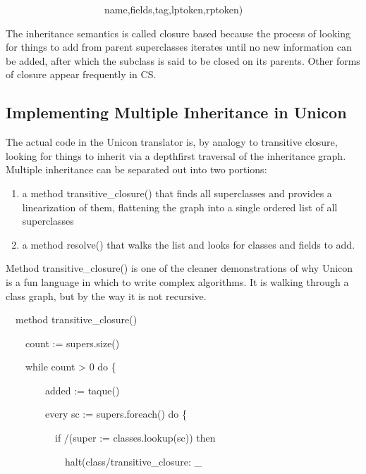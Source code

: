 {\ttfamily\mdseries
\ \ \ \ \ \ \ \ \ \ \ \ \ \ \ \ \ \ \ \ name,fields,tag,lptoken,rptoken)}

The inheritance semantics is called {\textquotedbl}closure
based{\textquotedbl} because the process of looking for things to add
from parent superclasses iterates until no new information can be
added, after which the subclass is said to be closed on its
parents. Other forms of closure appear frequently in CS.

\subsection{Implementing Multiple Inheritance in Unicon}

The actual code in the Unicon translator is, by analogy to transitive
closure, looking for things to inherit via a depthfirst traversal of
the inheritance graph. Multiple inheritance can be separated out into
two portions:

\liststyleLxliii
\begin{enumerate}

\item a method transitive\_closure() that finds all superclasses and
provides a linearization of them, flattening the graph into a single
ordered list of all superclasses

\item a method resolve() that walks the list and looks for classes and
fields to add.

\end{enumerate}

Method transitive\_closure() is one of the cleaner demonstrations of
why Unicon is a fun language in which to write complex algorithms. It
is walking through a class graph, but by the way it is not recursive.

{\ttfamily\mdseries
\ \ method transitive\_closure()}

{\ttfamily\mdseries
\ \ \ \ count := supers.size()}

{\ttfamily\mdseries
\ \ \ \ while count {\textgreater} 0 do \{}

{\ttfamily\mdseries
\ \ \ \ \ \ \ \ added := taque()}

{\ttfamily\mdseries
\ \ \ \ \ \ \ \ every sc := supers.foreach() do \{}

{\ttfamily\mdseries
\ \ \ \ \ \ \ \ \ \ if /(super := classes.lookup(sc)) then}

{\ttfamily\mdseries
\ \ \ \ \ \ \ \ \ \ \ \ halt({\textquotedbl}class/transitive\_closure: \_}

